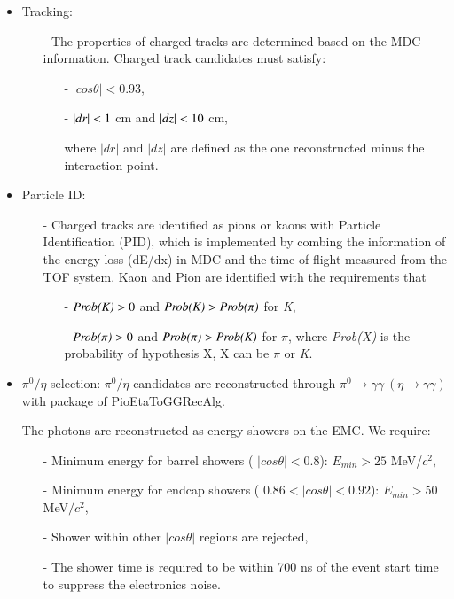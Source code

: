 \begin{itemize}
	\item Tracking:
		\begin{itemize}
			\item[-] The properties of charged tracks are determined based on the MDC information. Charged track candidates must satisfy:
				\begin{itemize}
					\item[-] $|cos\theta| < 0.93$, 
                    \item[-] $|dr| < \boldmath 1 $ cm and $|dz| < \boldmath 10$ cm,

						where $|dr|$ and $|dz|$ are defined as the one reconstructed minus the interaction point.
				\end{itemize}
		\end{itemize}
	\item Particle ID:
		\begin{itemize}
			\item[-] Charged tracks are identified as pions or kaons with Particle Identification (PID), which is implemented by combing the information of the energy loss (dE/dx) in MDC and the time-of-flight measured from
				the TOF system. Kaon and Pion are identified with the requirements that 
				\begin{itemize}
					\item[-] $\emph{Prob(K)} > 0$ and $\emph{Prob(K)} > \emph{Prob($\pi$)}$ for \emph{K},
					\item[-] $\emph{Prob($\pi$)} > 0$ and $\emph{Prob($\pi$)} > \emph{Prob(K)}$ for \emph{$\pi$},
						where \emph{Prob(X)} is the probability of hypothesis X, X can be \emph{$\pi$} or \emph{K}.
				\end{itemize}
		\end{itemize}
    \item $\pi^{0}/\eta$ selection: $\pi^{0}/\eta$ candidates are reconstructed through $\pi^{0} \rightarrow \gamma\gamma\ (\eta \rightarrow \gamma\gamma)$ with package of PioEtaToGGRecAlg.
		

		The photons are reconstructed as energy showers on the EMC. We require:
		\begin{itemize}
			\item[-] Minimum energy for barrel showers ( $|cos\theta| < 0.8$): $E_{min} >25$ MeV/$c^{2}$,
			\item[-] Minimum energy for endcap showers ( $0.86 < |cos\theta| < 0.92$): $E_{min} >50$ MeV$/c^{2}$,
			\item[-] Shower within other $|cos\theta|$ regions are rejected,
			\item[-] The shower time is required to be within 700 ns of the event start time to suppress the electronics noise. 
		\end{itemize}


\end{itemize}
